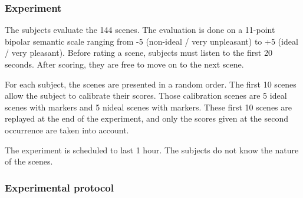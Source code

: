 \documentclass[12pt]{elsarticle}
\begin{document}
\subsubsection*{Experiment}




The subjects evaluate the 144 scenes. The evaluation is done on a 11-point bipolar semantic scale ranging from -5 (non-ideal / very unpleasant) to +5 (ideal / very pleasant). Before rating a scene, subjects must listen to the first 20 seconds. After scoring, they are free to move on to the next scene.

For each subject, the scenes are presented in a random order. The first 10 scenes allow the subject to calibrate their scores. Those calibration scenes are  5 ideal scenes with markers and 5 nideal scenes with markers. These first 10 scenes are replayed at the end of the experiment, and only the scores given at the second occurrence are taken into account.

The experiment is scheduled to last 1 hour. The subjects do not know the nature of the scenes.

\subsubsection*{Experimental protocol}

\end{document}
